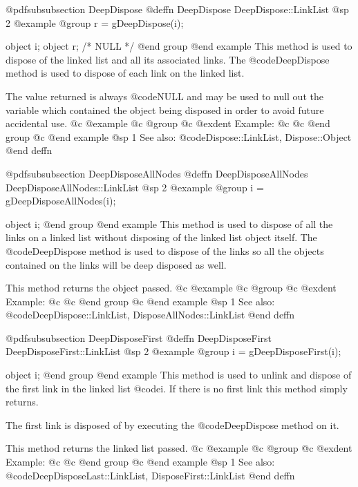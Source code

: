 @pdfsubsubsection {DeepDispose}
@deffn {DeepDispose} DeepDispose::LinkList
@sp 2
@example
@group
r = gDeepDispose(i);

object  i;
object  r;     /*  NULL  */
@end group
@end example
This method is used to dispose of the linked list and all its associated
links.  The @code{DeepDispose} method is used to dispose of each link
on the linked list.

The value returned is always @code{NULL} and may be used to null out
the variable which contained the object being disposed in order to
avoid future accidental use.
@c @example
@c @group
@c @exdent Example:
@c 
@c @end group
@c @end example
@sp 1
See also:  @code{Dispose::LinkList, Dispose::Object}
@end deffn









@pdfsubsubsection {DeepDisposeAllNodes}
@deffn {DeepDisposeAllNodes} DeepDisposeAllNodes::LinkList
@sp 2
@example
@group
i = gDeepDisposeAllNodes(i);

object  i;
@end group
@end example
This method is used to dispose of all the links on a linked list without
disposing of the linked list object itself.  The @code{DeepDispose}
method is used to dispose of the links so all the objects contained on
the links will be deep disposed as well.

This method returns the object passed.
@c @example
@c @group
@c @exdent Example:
@c 
@c @end group
@c @end example
@sp 1
See also:  @code{DeepDispose::LinkList, DisposeAllNodes::LinkList}
@end deffn
















@pdfsubsubsection {DeepDisposeFirst}
@deffn {DeepDisposeFirst} DeepDisposeFirst::LinkList
@sp 2
@example
@group
i = gDeepDisposeFirst(i);

object  i;
@end group
@end example
This method is used to unlink and dispose of the first link in the
linked list @code{i}.  If there is no first link this method simply
returns.

The first link is disposed of by executing the @code{DeepDispose}
method on it.

This method returns the linked list passed.
@c @example
@c @group
@c @exdent Example:
@c 
@c @end group
@c @end example
@sp 1
See also:  @code{DeepDisposeLast::LinkList, DisposeFirst::LinkList}
@end deffn











